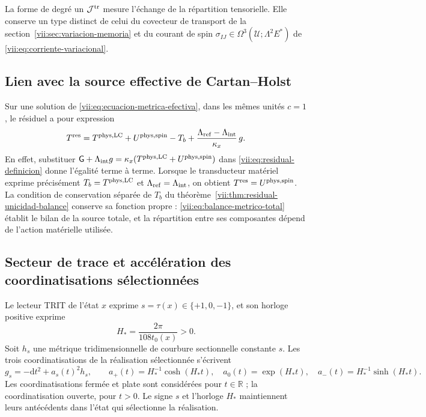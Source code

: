 La forme de degré un \(\mathcal J^{\rm tr}\) mesure l'échange de la répartition tensorielle. Elle conserve un type distinct de celui du covecteur de transport de la section~\ref{vii:sec:variacion-memoria} et du courant de spin \(\sigma_{IJ}\in\Omega^3(\mathcal U;\Lambda^2E^*)\) de \eqref{vii:eq:corriente-variacional}.

\subsection{Lien avec la source effective de Cartan--Holst}
\label{vii:subsec:residual-fuente-cartan}

Sur une solution de \eqref{vii:eq:ecuacion-metrica-efectiva}, dans les
mêmes unités \(c=1\), le résiduel a pour expression
\begin{equation}
 T^{\rm res}
 =T^{\rm phys,LC}+U^{\rm phys,spin}-T_b
   +\frac{\Lambda_{\rm ref}-\Lambda_{\rm int}}{\kappa_x}\,g.
 \label{vii:eq:residual-composicion-cartan}
\end{equation}
En effet, substituer \(\mathsf G+\Lambda_{\rm int}g
  =\kappa_x(T^{\rm phys,LC}+U^{\rm phys,spin})\) dans \eqref{vii:eq:residual-definicion} donne l'égalité terme à terme. Lorsque le transducteur matériel exprime précisément \(T_b=T^{\rm phys,LC}\) et \(\Lambda_{\rm ref}=\Lambda_{\rm int}\), on obtient \(T^{\rm res}=U^{\rm phys,spin}\). La condition de conservation séparée de \(T_b\) du théorème~\ref{vii:thm:residual-unicidad-balance} conserve sa fonction propre : \eqref{vii:eq:balance-metrico-total} établit le bilan de la source totale, et la répartition entre ses composantes dépend de l'action matérielle utilisée.

\subsection{Secteur de trace et accélération des coordinatisations sélectionnées}
\label{vii:subsec:residual-aceleracion-ds}

Le lecteur TRIT de l'état \(x\) exprime \(s=\tau(x)\in\{+1,0,-1\}\), et son horloge positive exprime
\begin{equation}
 H_*=\frac{2\pi}{108t_0(x)}>0.
 \label{vii:eq:reloj-carta-ds}
\end{equation}
Soit \(h_s\) une métrique tridimensionnelle de courbure sectionnelle constante \(s\). Les trois coordinatisations de la réalisation sélectionnée s'écrivent
\begin{equation}
 g_s=-\mathrm dt^2+a_s(t)^2h_s,\qquad
 a_+(t)=H_*^{-1}\cosh(H_*t),\quad
 a_0(t)=\exp(H_*t),\quad
 a_-(t)=H_*^{-1}\sinh(H_*t).
 \label{vii:eq:cartas-ds-residual}
\end{equation}
Les coordinatisations fermée et plate sont considérées pour \(t\in\mathbb R\) ; la coordinatisation ouverte, pour \(t>0\). Le signe \(s\) et l'horloge \(H_*\) maintiennent leurs antécédents dans l'état qui sélectionne la réalisation.

